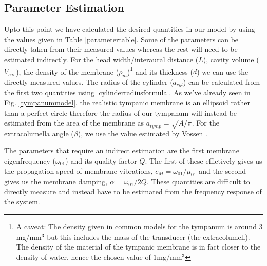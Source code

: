 \subsection{Parameter Estimation}\label{parameterestimation}
Upto this point we have calculated the desired quantities in our model by using the values given in Table \ref{parametertable}.
Some of the parameters can be directly taken from their measured values whereas
the rest will need to be estimated indirectly. 
For the head width/interaural distance ($L$), cavity volume ($V_{cav}$), the density of the membrane ($\rho_m$)\footnote{A caveat: The density given in common models for the tympanum
is around $3$mg/mm$^3$ but this includes the mass of the transducer (the extracolumell). The density of the material of the tympanic membrane is in fact closer to the density of water,
hence the chosen value of $1$mg/mm$^3$} and its thickness ($d$)
we can use the directly measured values. The radius of the cylinder ($a_{cyl}$) can be calculated from the first two quantities
using \eqref{cylinderradiusformula}. 
As we've already seen in Fig. \ref{tympanummodel}, the realistic tympanic membrane is an ellipsoid rather than a perfect circle therefore the radius of our tympanum will
instead be estimated from the area of the membrane as $a_{tymp}=\sqrt{A/\pi}$. For the extracolumella angle ($\beta$), we use the value estimated by Vossen \cite{vossenjasa}.

The parameters that require an indirect estimation are the first membrane eigenfrequency ($\omega_{01}$) and
its quality factor $Q$. The first of these effictively gives us the propagation speed of membrane vibrations, $c_M=\omega_{01}/\mu_{01}$ 
and the second gives us the membrane damping, $\alpha=\omega_{01}/2Q$. These quantities are difficult to directly measure and instead
have to be estimated from the frequency response of the system. 

